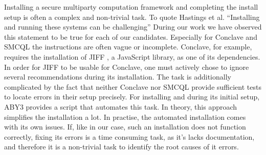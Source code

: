 Installing a secure multiparty computation framework and completing the install setup is often a complex and non-trivial task. To quote Hastings et al. ``Installing and running these systems can be challenging'' \cite{hastings2019sok} 
During our work we have observed this statement to be true for each of our candidates.
Especially for Conclave and SMCQL the instructions are often vague or incomplete. Conclave, for example, requires the installation of JIFF \cite{JIFF}, a JavaScript library, as one of its dependencies. In order for JIFF to be usable for Conclave, one must actively chose to ignore several recommendations during its installation. The task is additionally complicated by the fact that neither Conclave nor SMCQL provide sufficient tests to locate errors in their setup precisely. For installing and during its initial setup, ABY3 provides a script that automates this task. In theory, this approach simplifies the installation a lot. In practise, the automated installation comes with its own issues. If, like in our case, such an installation does not function correctly, fixing its errors is a time consuming task, as it's lacks documentation, and therefore it is a non-trivial task to identify the root causes of it errors.


